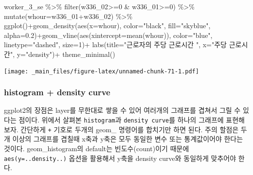 \documentclass[
]{book}
\newenvironment{Shaded}{\begin{snugshade}}{\end{snugshade}}
\newcommand{\AttributeTok}[1]{\textcolor[rgb]{0.77,0.63,0.00}{#1}}
\newcommand{\DecValTok}[1]{\textcolor[rgb]{0.00,0.00,0.81}{#1}}
\newcommand{\FloatTok}[1]{\textcolor[rgb]{0.00,0.00,0.81}{#1}}
\newcommand{\FunctionTok}[1]{\textcolor[rgb]{0.00,0.00,0.00}{#1}}
\newcommand{\NormalTok}[1]{#1}
\newcommand{\SpecialCharTok}[1]{\textcolor[rgb]{0.00,0.00,0.00}{#1}}
\newcommand{\StringTok}[1]{\textcolor[rgb]{0.31,0.60,0.02}{#1}}
\theoremstyle{definition}
\theoremstyle{definition}
\theoremstyle{definition}
\theoremstyle{definition}
\theoremstyle{remark}
\begin{document}
\begin{Shaded}
\begin{Highlighting}[]
\NormalTok{worker\_3\_se }\SpecialCharTok{\%\textgreater{}\%} 
  \FunctionTok{filter}\NormalTok{(w336\_02}\SpecialCharTok{\textgreater{}=}\DecValTok{0} \SpecialCharTok{\&}\NormalTok{ w336\_01}\SpecialCharTok{\textgreater{}=}\DecValTok{0}\NormalTok{) }\SpecialCharTok{\%\textgreater{}\%} 
  \FunctionTok{mutate}\NormalTok{(}\AttributeTok{whour=}\NormalTok{w336\_01}\SpecialCharTok{+}\NormalTok{w336\_02) }\SpecialCharTok{\%\textgreater{}\%} 
  \FunctionTok{ggplot}\NormalTok{()}\SpecialCharTok{+}\FunctionTok{geom\_density}\NormalTok{(}\FunctionTok{aes}\NormalTok{(}\AttributeTok{x=}\NormalTok{whour), }\AttributeTok{color=}\StringTok{"black"}\NormalTok{, }\AttributeTok{fill=}\StringTok{"skyblue"}\NormalTok{, }\AttributeTok{alpha=}\FloatTok{0.2}\NormalTok{)}\SpecialCharTok{+}\FunctionTok{geom\_vline}\NormalTok{(}\FunctionTok{aes}\NormalTok{(}\AttributeTok{xintercept=}\FunctionTok{mean}\NormalTok{(whour)), }\AttributeTok{color=}\StringTok{"blue"}\NormalTok{, }\AttributeTok{linetype=}\StringTok{"dashed"}\NormalTok{, }\AttributeTok{size=}\DecValTok{1}\NormalTok{)}\SpecialCharTok{+}
  \FunctionTok{labs}\NormalTok{(}\AttributeTok{title=}\StringTok{"근로자의 주당 근로시간 "}\NormalTok{, }\AttributeTok{x=}\StringTok{"주당 근로시간"}\NormalTok{, }\AttributeTok{y=}\StringTok{"density"}\NormalTok{)}\SpecialCharTok{+}
  \FunctionTok{theme\_minimal}\NormalTok{()}
\end{Highlighting}
\end{Shaded}

\texttt{[image: \_main\_files/figure-latex/unnamed-chunk-71-1.pdf]}

\hypertarget{histogram-density-curve}{%
\subsubsection{histogram + density curve}\label{histogram-density-curve}}

ggplot2의 장점은 layer를 무한대로 쌓을 수 있어 여러개의 그래프를 겹쳐서 그릴 수 있다는 점이다. 위에서 살펴본 \texttt{histogram}과 \texttt{density\ curve}를 하나의 그래프에 표현해보자. 간단하게 \texttt{+} 기호로 두개의 geom\_ 명령어를 합치기만 하면 된다. 주의 할점은 두개 이상의 그래프를 겹칠때 x축과 y축은 모두 동일한 변수 또는 통계값이어야 한다는 것이다. geom\_histogram의 default는 빈도수(count)이기 때문에 \texttt{aes(y=..density..)} 옵션을 활용해서 y축을 density curve와 동일하게 맞추어야 한다.
\end{document}
